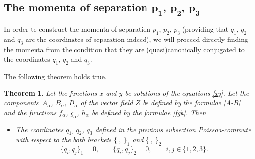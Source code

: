 \documentclass[10pt,a4paper]{amsart}
\def\a{\alpha}
\numberwithin{equation}{section}
\newtheorem{Theorem}{Theorem}[section]
\begin{document}
\subsection[The momenta of separation p\_1, p\_2, p\_3]{The momenta of separation $\boldsymbol{p_1}$, $\boldsymbol{p_2}$, $\boldsymbol{p_3}$}
In order to construct the momenta of separation $p_1$, $p_2$, $p_3$ (providing that $q_1$, $q_2$ and $q_3$ are the coordinates of separation indeed), we will proceed directly finding the momenta from the condition that they are (quasi)canonically conjugated to the coordinates $q_1$, $q_2$ and $q_3$.

The following theorem holds true.

\begin{Theorem}\label{momenti}
Let the functions $x$ and $y$ be solutions of the equations \eqref{xy}. Let the components~$A_{\a}$, $B_{\a}$, $D_{\a}$ of the vector field $Z$ be defined by the formulae \eqref{A-B} and the functions $f_{\a}$, $g_{\a}$, $h_{\a}$ be defined by the formulae \eqref{fgh}. Then
\begin{itemize}\itemsep=0pt
\item[$(i)$] The coordinates $q_1$, $q_2$, $q_3$ defined in the previous subsection Poisson-commute with respect to the both brackets $ \{\ ,\ \}_1$ and $\{\ , \ \}_2$
\begin{equation}\label{qcanon}
\{q_i,q_j\}_1=0, \qquad
\{q_i,q_j\}_2=0, \qquad i, j\in \{1,2,3\}.
\end{equation}


\end{itemize}
\end{Theorem}
\end{document}
